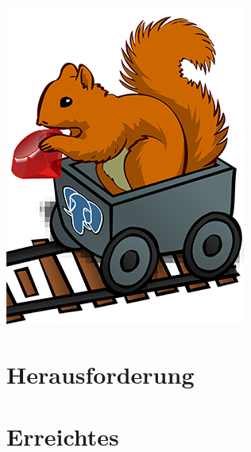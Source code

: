 \documentclass[utf8,18pt]{beamer}
\author[Döpmann, Kühnle, Umnus]{\authornames}
\title{\projectname}
\subtitle{Web-Applikation zum Üben von SQL}
\date{10.~Juli~2019}
\begin{document}
\begin{frame}[plain,label=titleframe]
  \begin{center}
    \includegraphics[height=.4\textheight]{resources/SQRRL_LOGO.png}
  \end{center}
  \maketitle
\end{frame}


\begin{frame}
  \tableofcontents
\end{frame}

\section{Herausforderung}



\section{Erreichtes}



\end{document}

